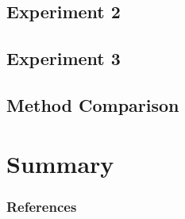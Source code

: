 \documentclass[10pt]{beamer}
\begin{document}
\subsection{Experiment 2}

\subsection{Experiment 3}

\subsection{Method Comparison}

%

\section{Summary}



\begin{frame}[allowframebreaks]
  \frametitle{References}
  
  {\footnotesize  }
\end{frame}

\end{document}
